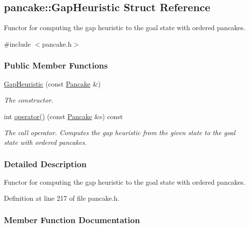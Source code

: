 \hypertarget{structpancake_1_1GapHeuristic}{}\subsection{pancake\+:\+:Gap\+Heuristic Struct Reference}
\label{structpancake_1_1GapHeuristic}


Functor for computing the gap heuristic to the goal state with ordered pancakes.  




{\ttfamily \#include $<$pancake.\+h$>$}

\subsubsection*{Public Member Functions}
\begin{DoxyCompactItemize}
\item 
\hyperlink{structpancake_1_1GapHeuristic_a698b44db4eb2a7ab79d6210289706ca1}{Gap\+Heuristic} (const \hyperlink{structpancake_1_1Pancake}{Pancake} \&)\hypertarget{structpancake_1_1GapHeuristic_a698b44db4eb2a7ab79d6210289706ca1}{}\label{structpancake_1_1GapHeuristic_a698b44db4eb2a7ab79d6210289706ca1}

\begin{DoxyCompactList}\small\item\em The constructor. \end{DoxyCompactList}\item 
int \hyperlink{structpancake_1_1GapHeuristic_a24357ebadcf78ec6987a8af688e1dc33}{operator()} (const \hyperlink{structpancake_1_1Pancake}{Pancake} \&s) const 
\begin{DoxyCompactList}\small\item\em The call operator. Computes the gap heuristic from the given state to the goal state with ordered pancakes. \end{DoxyCompactList}\end{DoxyCompactItemize}


\subsubsection{Detailed Description}
Functor for computing the gap heuristic to the goal state with ordered pancakes. 

Definition at line 217 of file pancake.\+h.



\subsubsection{Member Function Documentation}

